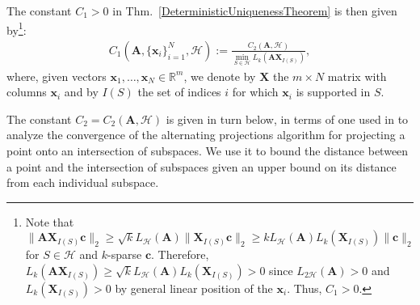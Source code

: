 \documentclass[9pt,twocolumn]{pnas-new}
\newtheorem{lemma}{Lemma}
\begin{document}


The constant $C_1 > 0$ in Thm.~\ref{DeterministicUniquenessTheorem} is then given by\footnote{Note that $\|\mathbf{AX}_{I(S)}\mathbf{c}\|_2 \geq \sqrt{k} L_\mathcal{H}(\mathbf{A})\|\mathbf{X}_{I(S)}\mathbf{c}\|_2 \geq k L_\mathcal{H}(\mathbf{A}) L_k(\mathbf{X}_{I(S)})\|\mathbf{c}\|_2$ for $S \in \mathcal{H}$ and $k$-sparse $\mathbf{c}$. Therefore, $L_k(\mathbf{AX}_{I(S)}) \geq \sqrt{k} L_\mathcal{H}(\mathbf{A}) L_k(\mathbf{X}_{I(S)}) > 0$ since $L_{2\mathcal{H}}(\mathbf{A})> 0$ and $L_k(\mathbf{X}_{I(S)}) > 0$ by general linear position of the $\mathbf{x}_i$. Thus, $C_1 > 0$.}:
\begin{align}\label{Cdef1}
C_1(\mathbf{A}, \{\mathbf{x}_i\}_{i=1}^N, \mathcal{H}) := \frac{ C_2(\mathbf{A}, \mathcal{H}) } { \min_{S \in \mathcal{H}} L_k(\mathbf{AX}_{I(S)}) },
\end{align}
where, given vectors $\mathbf{x}_1, \ldots, \mathbf{x}_N \in \mathbb{R}^m$, we denote by $\mathbf{X}$ the $m \times N$ matrix with columns $\mathbf{x}_i$ and by $I(S)$ the set of indices $i$ for which $\mathbf{x}_i$ is supported in $S$.

The constant $C_2 = C_2(\mathbf{A}, \mathcal{H})$ is given in turn below, in terms of one used in \cite{Deutsch12} to analyze the convergence of the alternating projections algorithm for projecting a point onto an intersection of subspaces. 
We use it to bound the distance between a point and the intersection of subspaces given an upper bound on its distance from each individual subspace.
\end{document}
